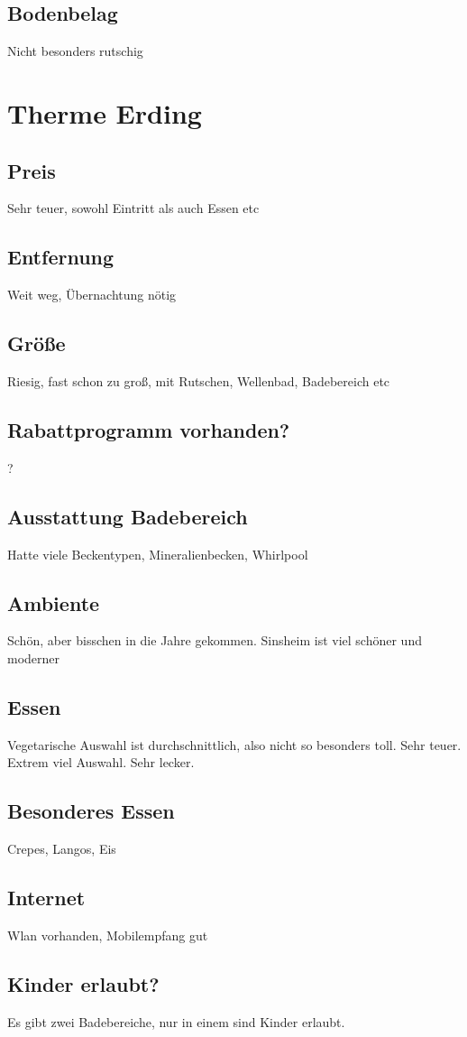 \documentclass{article}
\begin{document}
\subsection*{Bodenbelag} Nicht besonders rutschig
\pagebreak

\section*{Therme Erding}
\subsection*{Preis} Sehr teuer, sowohl Eintritt als auch Essen etc
\subsection*{Entfernung} Weit weg, Übernachtung nötig
\subsection*{Größe} Riesig, fast schon zu groß, mit Rutschen, Wellenbad, Badebereich etc
\subsection*{Rabattprogramm vorhanden?} ?
\subsection*{Ausstattung Badebereich} Hatte viele Beckentypen, Mineralienbecken, Whirlpool
\subsection*{Ambiente} Schön, aber bisschen in die Jahre gekommen. Sinsheim ist viel schöner und moderner
\subsection*{Essen} Vegetarische Auswahl ist durchschnittlich, also nicht so besonders toll. Sehr teuer. Extrem viel Auswahl. Sehr lecker.
\subsection*{Besonderes Essen} Crepes, Langos, Eis
\subsection*{Internet} Wlan vorhanden, Mobilempfang gut
\subsection*{Kinder erlaubt?} Es gibt zwei Badebereiche, nur in einem sind Kinder erlaubt.
\end{document}

